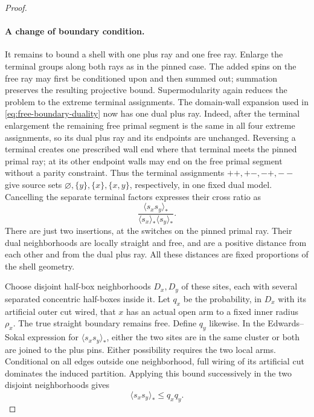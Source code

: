 \begin{proof}
\paragraph{A change of boundary condition.}
It remains to bound a shell with one plus ray and one free ray.
Enlarge the terminal groups along both rays as in the pinned case.
The added spins on the free ray may first be conditioned upon and
then summed out; summation preserves the resulting projective bound.
Supermodularity again reduces the problem to the extreme terminal
assignments. The domain-wall expansion used in
\eqref{eq:free-boundary-duality} now has one dual plus ray.
Indeed, after the terminal enlargement the remaining free primal
segment is the same in all four extreme assignments, so its dual
plus ray and its endpoints are unchanged. Reversing a terminal
creates one prescribed wall end where that terminal meets the pinned
primal ray; at its other endpoint walls may end on the free primal
segment without a parity constraint. Thus the terminal assignments
$++,+-,-+,--$ give source sets
$\varnothing,\{y\},\{x\},\{x,y\}$, respectively, in one fixed dual
model. Cancelling the separate terminal factors expresses their
cross ratio as
\begin{equation}
 \frac{\langle s_xs_y\rangle_*}
      {\langle s_x\rangle_*\langle s_y\rangle_*}.
 \label{eq:mixed-boundary-ratio}
\end{equation}
There are just two insertions, at the switches on the pinned primal
ray. Their dual neighborhoods are locally straight and free, and
are a positive distance from each other and from the dual plus ray.
All these distances are fixed proportions of the shell geometry.

Choose disjoint half-box neighborhoods $D_x,D_y$ of these sites,
each with several separated concentric half-boxes inside it. Let
$q_x$ be the probability, in $D_x$ with its artificial outer cut wired,
that $x$ has an actual open arm to a fixed inner radius $\rho_x$.
The true straight boundary remains free. Define $q_y$ likewise.
In the Edwards--Sokal expression for $\langle s_xs_y\rangle_*$,
either the two sites are in the same cluster or both are joined to
the plus pins. Either possibility requires the two local arms.
Conditional on all edges outside one neighborhood, full wiring of
its artificial cut dominates the induced partition. Applying this
bound successively in the two disjoint neighborhoods gives
\begin{equation}
             \langle s_xs_y\rangle_*\le q_xq_y.
 \label{eq:mixed-two-arm-upper}
\end{equation}


\end{proof}

